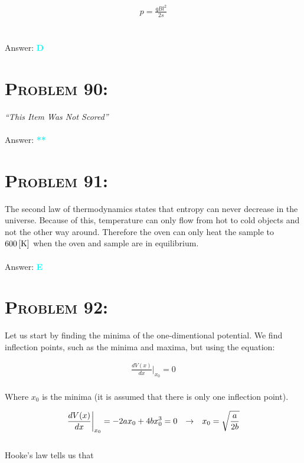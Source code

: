 \documentclass{article}
\begin{document}
\begin{gather}
\boxed{p = \frac{qB l^{2}}{2s}}\nonumber
\end{gather}
\\\\
Answer: \textbf{\textcolor{cyan}D}\\


\section{\textsc{Problem 90:}}
 \textit{\enquote{This Item Was Not Scored}}
\\\\
Answer: \textbf{\textcolor{cyan}*\textcolor{cyan}*}\\


\section{\textsc{Problem 91:}} The second law of thermodynamics states that entropy can never decrease in the universe. Because of this, temperature can only flow from hot to cold objects and not the other way around. Therefore the oven can only heat the sample to $\unit[600]{[K]}$ when the oven and sample are in equilibrium.
\\\\
Answer: \textbf{\textcolor{cyan}E}\\


\section{\textsc{Problem 92:}} Let us start by finding the minima of the one-dimentional potential. We find inflection points, such as the minima and maxima, but using the equation:

\begin{gather}
\frac{ dV(x) }{dx}\biggr\rvert_{x_{0}} = 0
\end{gather}
\\
Where $x_{0}$ is the minima (it is assumed that there is only one inflection point). 

\begin{gather}
\frac{ dV(x) }{dx}\biggr\rvert_{x_{0}} = -2ax_{0} + 4bx_{0}^{3} = 0 
\hspace{.1in} \rightarrow \hspace{.1in}
x_{0} = \sqrt{\frac{a}{2b}}\nonumber
\end{gather}
\\
Hooke's law tells us that
\end{document}
